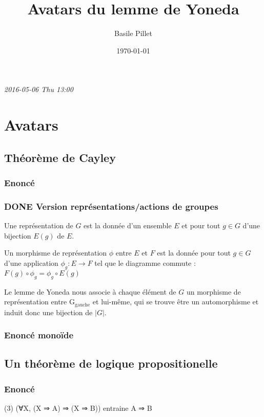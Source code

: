 \documentclass[11pt]{article}
\title{Avatars du lemme de Yoneda}
\author{Basile Pillet}
\date{\today}
\begin{document}
\maketitle

\setcounter{tocdepth}{3}
\tableofcontents
\vspace*{1cm}


\textit{2016-05-06 Thu 13:00}

\section{Avatars}
\label{sec-1}
\subsection{Théorème de Cayley}
\label{sec-1-1}
\subsubsection{Enoncé}
\label{sec-1-1-1}
\subsubsection{\textbf{DONE} Version représentations/actions de groupes}
\label{sec-1-1-2}

Une représentation de $G$ est la donnée d'un ensemble $E$ et pour tout $g \in G$ d'une bijection $E(g)$ de $E$.

Un morphisme de représentation $\phi$ entre $E$ et $F$ est la donnée pour tout $g \in G$ d'une application $\phi_g : E \to F$ tel que le diagramme commute : $F(g) \circ \phi_g = \phi_g \circ E(g)$

Le lemme de Yoneda nous associe à chaque élément de $G$ un morphisme de représentation entre G$_{\mathrm{gauche}}$ et lui-même, qui se trouve être un automorphisme et induit donc une bijection de $|G|$.
\subsubsection{Enoncé monoïde}
\label{sec-1-1-3}
\subsection{Un théorème de logique propositionelle}
\label{sec-1-2}
\subsubsection{Enoncé}
\label{sec-1-2-1}

(3)   (∀X, (X ⇒ A) ⇒ (X ⇒ B)) entraine A ⇒ B
\end{document}

